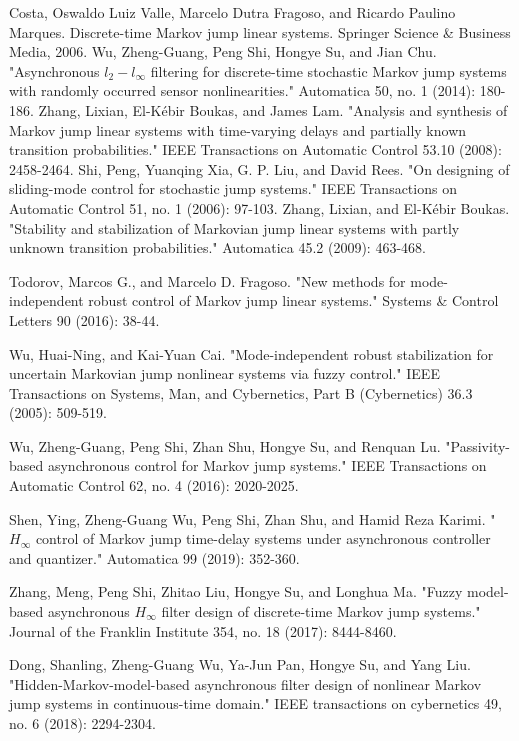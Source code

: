 \documentclass[conference]{IEEEtran}
\begin{document}
\begin{thebibliography}{1}
	Costa, Oswaldo Luiz Valle, Marcelo Dutra Fragoso, and Ricardo Paulino Marques. Discrete-time Markov jump linear systems. Springer Science \& Business Media, 2006.
	Wu, Zheng-Guang, Peng Shi, Hongye Su, and Jian Chu. "Asynchronous $l_{2}-l_{\infty}$ filtering for discrete-time stochastic Markov jump systems with randomly occurred sensor nonlinearities." Automatica 50, no. 1 (2014): 180-186.
	Zhang, Lixian, El-Kébir Boukas, and James Lam. "Analysis and synthesis of Markov jump linear systems with time-varying delays and partially known transition probabilities." IEEE Transactions on Automatic Control 53.10 (2008): 2458-2464.
	Shi, Peng, Yuanqing Xia, G. P. Liu, and David Rees. "On designing of sliding-mode control for stochastic jump systems." IEEE Transactions on Automatic Control 51, no. 1 (2006): 97-103.
	Zhang, Lixian, and El-Kébir Boukas. "Stability and stabilization of Markovian jump linear systems with partly unknown transition probabilities." Automatica 45.2 (2009): 463-468.
	
	Todorov, Marcos G., and Marcelo D. Fragoso. "New methods for mode-independent robust control of Markov jump linear systems." Systems \& Control Letters 90 (2016): 38-44.
	
	Wu, Huai-Ning, and Kai-Yuan Cai. "Mode-independent robust stabilization for uncertain Markovian jump nonlinear systems via fuzzy control." IEEE Transactions on Systems, Man, and Cybernetics, Part B (Cybernetics) 36.3 (2005): 509-519.
	
	
	Wu, Zheng-Guang, Peng Shi, Zhan Shu, Hongye Su, and Renquan Lu. "Passivity-based asynchronous control for Markov jump systems." IEEE Transactions on Automatic Control 62, no. 4 (2016): 2020-2025.
	
	Shen, Ying, Zheng-Guang Wu, Peng Shi, Zhan Shu, and Hamid Reza Karimi. "$H_{\infty}$ control of Markov jump time-delay systems under asynchronous controller and quantizer." Automatica 99 (2019): 352-360.
	
	Zhang, Meng, Peng Shi, Zhitao Liu, Hongye Su, and Longhua Ma. "Fuzzy model-based asynchronous $H_{\infty}$ filter design of discrete-time Markov jump systems." Journal of the Franklin Institute 354, no. 18 (2017): 8444-8460.
	
	Dong, Shanling, Zheng-Guang Wu, Ya-Jun Pan, Hongye Su, and Yang Liu. "Hidden-Markov-model-based asynchronous filter design of nonlinear Markov jump systems in continuous-time domain." IEEE transactions on cybernetics 49, no. 6 (2018): 2294-2304.
	

\end{thebibliography}
\end{document}
